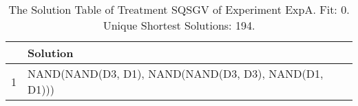 \begin{table}[ht]
\centering
\begin{tabular}{rp{9cm}}
  \hline
 & Solution \\ 
  \hline
1 & NAND(NAND(D3, D1), NAND(NAND(D3, D3), NAND(D1, D1))) \\ 
   \hline
\end{tabular}
\caption{The Solution Table of Treatment SQSGV of Experiment ExpA. Fit: 0. Unique Shortest Solutions: 194.} 
\end{table}
